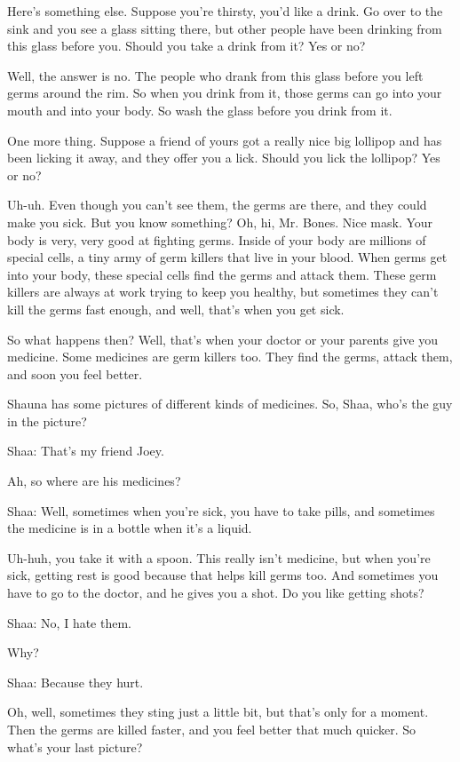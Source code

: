 Here's something else. Suppose you're thirsty, you'd like a drink. Go over to the sink and you see a glass sitting there, but other people have been drinking from this glass before you. Should you take a drink from it? Yes or no?

Well, the answer is no. The people who drank from this glass before you left germs around the rim. So when you drink from it, those germs can go into your mouth and into your body. So wash the glass before you drink from it.

One more thing. Suppose a friend of yours got a really nice big lollipop and has been licking it away, and they offer you a lick. Should you lick the lollipop? Yes or no?

Uh-uh. Even though you can't see them, the germs are there, and they could make you sick. But you know something? Oh, hi, Mr. Bones. Nice mask. Your body is very, very good at fighting germs. Inside of your body are millions of special cells, a tiny army of germ killers that live in your blood. When germs get into your body, these special cells find the germs and attack them. These germ killers are always at work trying to keep you healthy, but sometimes they can't kill the germs fast enough, and well, that's when you get sick.

So what happens then? Well, that's when your doctor or your parents give you medicine. Some medicines are germ killers too. They find the germs, attack them, and soon you feel better.

Shauna has some pictures of different kinds of medicines. So, Shaa, who's the guy in the picture?

Shaa: That's my friend Joey.

Ah, so where are his medicines?

Shaa: Well, sometimes when you're sick, you have to take pills, and sometimes the medicine is in a bottle when it's a liquid.

Uh-huh, you take it with a spoon. This really isn't medicine, but when you're sick, getting rest is good because that helps kill germs too. And sometimes you have to go to the doctor, and he gives you a shot. Do you like getting shots?

Shaa: No, I hate them.

Why?

Shaa: Because they hurt.

Oh, well, sometimes they sting just a little bit, but that's only for a moment. Then the germs are killed faster, and you feel better that much quicker. So what's your last picture?

